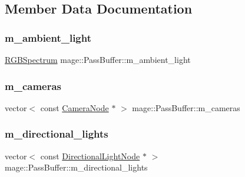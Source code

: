 \subsection{Member Data Documentation}
\hypertarget{structmage_1_1_pass_buffer_a311ad723470aff0ad80c325d9ead07b9}{}\label{structmage_1_1_pass_buffer_a311ad723470aff0ad80c325d9ead07b9} 
\subsubsection{\texorpdfstring{m\+\_\+ambient\+\_\+light}{m\_ambient\_light}}
{\footnotesize\ttfamily \hyperlink{structmage_1_1_r_g_b_spectrum}{R\+G\+B\+Spectrum} mage\+::\+Pass\+Buffer\+::m\+\_\+ambient\+\_\+light}

\hypertarget{structmage_1_1_pass_buffer_a4885440342be6a2cd11002781704a63f}{}\label{structmage_1_1_pass_buffer_a4885440342be6a2cd11002781704a63f} 
\subsubsection{\texorpdfstring{m\+\_\+cameras}{m\_cameras}}
{\footnotesize\ttfamily vector$<$ const \hyperlink{classmage_1_1_camera_node}{Camera\+Node} $\ast$ $>$ mage\+::\+Pass\+Buffer\+::m\+\_\+cameras}

\hypertarget{structmage_1_1_pass_buffer_a20f2a4518ea6121e6c9ae0ed9d263435}{}\label{structmage_1_1_pass_buffer_a20f2a4518ea6121e6c9ae0ed9d263435} 
\subsubsection{\texorpdfstring{m\+\_\+directional\+\_\+lights}{m\_directional\_lights}}
{\footnotesize\ttfamily vector$<$ const \hyperlink{namespacemage_a7637b5351fc0f66a10badd80ebb35899}{Directional\+Light\+Node} $\ast$ $>$ mage\+::\+Pass\+Buffer\+::m\+\_\+directional\+\_\+lights}

\hypertarget{structmage_1_1_pass_buffer_a3691cc52fe3bc5f1c86bf0dad36061d8}{}\label{structmage_1_1_pass_buffer_a3691cc52fe3bc5f1c86bf0dad36061d8} 
